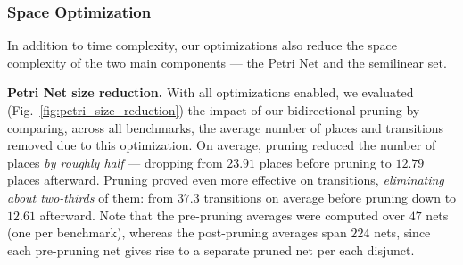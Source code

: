 \subsubsection{Space Optimization}

In addition to time complexity, our optimizations also reduce the space complexity of the two main components --- the Petri Net and the semilinear set.

\smallskip
\noindent
\textbf{Petri Net size reduction.}
%
With all optimizations enabled, we evaluated (Fig.~\ref{fig:petri_size_reduction}) the impact of our bidirectional pruning by comparing, across all benchmarks, the average number of places and transitions removed due to this optimization. On average, pruning reduced the number of places \textit{by roughly half} --- dropping from $23.91$ places before pruning to $12.79$ places afterward. Pruning proved even more effective on transitions, \textit{eliminating about two-thirds} of them: from $37.3$ transitions on average before pruning down to $12.61$ afterward. Note that the pre-pruning averages were computed over $47$ nets (one per benchmark), whereas the post-pruning averages span $224$ nets, since each pre-pruning net gives rise to a separate pruned net per each disjunct. 









